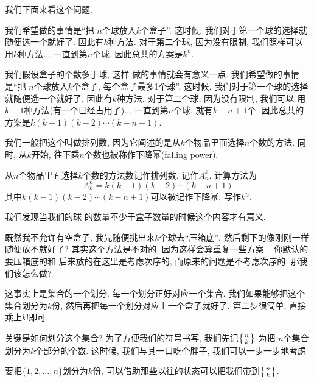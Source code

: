 我们下面来看这个问题. 

 我们希望做的事情是``把 $n$个球放入$k$个盒子''.
这时候, 我们对于第一个球的选择就随便选一个就好了. 因此有$k$种方法. 对于第二个球, 因为没有限制, 我们照样可以
用$k$种方法...  一直到第$n$个球. 因此总共的方案是$k^n$.

 我们假设盒子的个数多于球, 这样
做的事情就会有意义一点. 
我们希望做的事情是``把 $n$个球放入$k$个盒子, 每个盒子最多1个球''.
这时候, 我们对于第一个球的选择就随便选一个就好了. 因此有$k$种方法. 对于第二个球, 因为没有限制, 我们可以
用$k-1$种方法(有一个已经占用了)...  一直到第$n$个球, 就有$k-n+1$个. 因此总共的方案是$k(k-1)(k-2)\cdots(k-n+1)$.

我们一般把这个叫做排列数, 因为它阐述的是从$k$个物品里面选择$n$个数的方法. 
同时, 从$k$开始, 往下乘$n$个数也被称作下降幂(falling power). 

\begin{definition}[排列数]
  从$n$个物品里面选择$k$个数的方法数记作排列数. 记作$A_n^k$. 计算方法为
  $$
  A_k^n = k(k-1)(k-2)\cdots(k-n+1)
  $$
  其中$k(k-1)(k-2)\cdots(k-n+1)$可以被记作下降幂, 写作$k^{\underline n}$. 
\end{definition}

 我们发现当我们的球
的数量不少于盒子数量的时候这个内容才有意义. 

既然我不允许有空盒子, 我先随便挑出来$k$个球去``压箱底'', 然后剩下的像刚刚一样
随便放不就好了? 其实这个方法是不对的. 因为这样会算重复一些方案 -- 你默认的要压箱底的和
后来放的在这里是考虑次序的, 而原来的问题是不考虑次序的. 那我们该怎么做? 

这事实上是集合的一个划分. 每一个划分正好对应一个集合. 我们如果能够把这个集合划分为$k$份, 
然后再把每一个划分对应上一个盒子就好了. 第二步很简单, 直接乘上$k!$即可. 

关键是如何划分这个集合? 为了方便我们的符号书写, 我们先记$\left\{{n \atop k}\right\}$ 为把
$n$个集合划分为$k$个部分的个数. 这时候, 我们与其一口吃个胖子, 我们可以一步一步地考虑

要把$\{1,2,\ldots,n\}$划分为$k$份, 可以借助那些以往的状态可以把我们带到$\left\{{n \atop k}\right\}$. 

